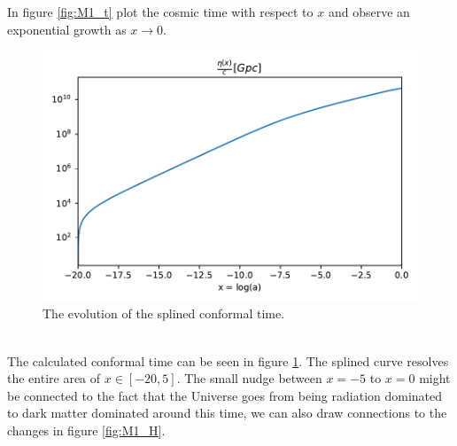 \documentclass{aa}
\begin{document}
In figure \ref{fig:M1_t} plot the cosmic time with respect to $x$ and observe an exponential growth as $x \rightarrow 0$. 
\begin{figure}[h!]
   \includegraphics[scale=0.5]{Figures/milestone_1/eta_c.pdf}
   \caption{The evolution of the splined conformal time.}\label{fig:M1_eta_c}
\end{figure}\\
The calculated conformal time can be seen in figure \ref{fig:M1_eta_c}. The splined curve resolves
the entire area of $x \in [-20, 5]$. The small nudge between $x=-5$ to $x=0$ might be connected to the fact that the
Universe goes from being radiation dominated to dark matter dominated around this time, we can also draw connections to the changes in figure \ref{fig:M1_H}.
\end{document}
